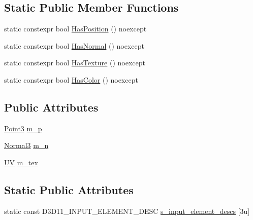 \subsection*{Static Public Member Functions}
\begin{DoxyCompactItemize}
\item 
static constexpr bool \mbox{\hyperlink{structmage_1_1rendering_1_1_vertex_position_normal_texture_a5cde27475fae5b650d91ccba4e6a2a8d}{Has\+Position}} () noexcept
\item 
static constexpr bool \mbox{\hyperlink{structmage_1_1rendering_1_1_vertex_position_normal_texture_a5b65b49d120fd660977f8f05b3ee7327}{Has\+Normal}} () noexcept
\item 
static constexpr bool \mbox{\hyperlink{structmage_1_1rendering_1_1_vertex_position_normal_texture_afebe9b59273a84b1ad78f2209d8f500e}{Has\+Texture}} () noexcept
\item 
static constexpr bool \mbox{\hyperlink{structmage_1_1rendering_1_1_vertex_position_normal_texture_abe3243efa83a9d4d28cf56282ba5b793}{Has\+Color}} () noexcept
\end{DoxyCompactItemize}
\subsection*{Public Attributes}
\begin{DoxyCompactItemize}
\item 
\mbox{\hyperlink{structmage_1_1_point3}{Point3}} \mbox{\hyperlink{structmage_1_1rendering_1_1_vertex_position_normal_texture_a6e41b77f1a21c4eb9f49cf936c131aee}{m\+\_\+p}}
\item 
\mbox{\hyperlink{structmage_1_1_normal3}{Normal3}} \mbox{\hyperlink{structmage_1_1rendering_1_1_vertex_position_normal_texture_a7c800b1234a9291361a21ce2289b1394}{m\+\_\+n}}
\item 
\mbox{\hyperlink{structmage_1_1_u_v}{UV}} \mbox{\hyperlink{structmage_1_1rendering_1_1_vertex_position_normal_texture_a8390daa0e3fd706ff42b32a62a935c3c}{m\+\_\+tex}}
\end{DoxyCompactItemize}
\subsection*{Static Public Attributes}
\begin{DoxyCompactItemize}
\item 
static const D3\+D11\+\_\+\+I\+N\+P\+U\+T\+\_\+\+E\+L\+E\+M\+E\+N\+T\+\_\+\+D\+E\+SC \mbox{\hyperlink{structmage_1_1rendering_1_1_vertex_position_normal_texture_a92382873cffce075bc19a7891d4577f4}{s\+\_\+input\+\_\+element\+\_\+descs}} \mbox{[}3u\mbox{]}
\end{DoxyCompactItemize}


